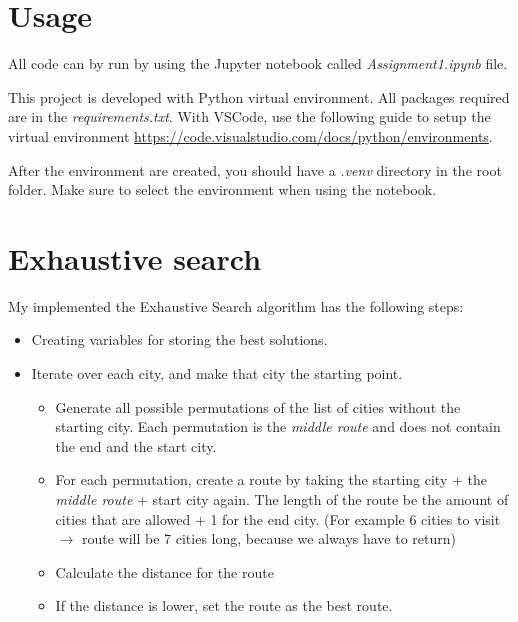\documentclass{article}
\begin{document}
    
    
    \section{Usage}

    All code can by run by using the Jupyter notebook called \textit{Assignment1.ipynb} file.

    This project is developed with Python virtual environment. 
    All packages required are in the \textit{requirements.txt}.
    With VSCode, use the following guide to setup the virtual environment \url{https://code.visualstudio.com/docs/python/environments}.

    After the environment are created, you should have a \textit{.venv} directory in the root folder. 
    Make sure to select the environment when using the notebook. 

    \newpage

    \section{Exhaustive search}

    My implemented the Exhaustive Search algorithm has the following steps: 

    \begin{itemize}
        \item Creating variables for storing the best solutions.
        \item Iterate over each city, and make that city the starting point. 
        \begin{itemize}
            \item Generate all possible permutations of the list of cities without the starting city. Each permutation is the \textit{middle route} and does not contain the end and the start city.
            \item For each permutation, create a route by taking the starting city + the \textit{middle route} + start city again. The length of the route be the amount of cities that are allowed + 1 for the end city. (For example 6 cities to visit $\to$ route will be 7 cities long, because we always have to return)
            \item Calculate the distance for the route
            \item If the distance is lower, set the route as the best route. 
        \end{itemize}
    \end{itemize}
\end{document}

